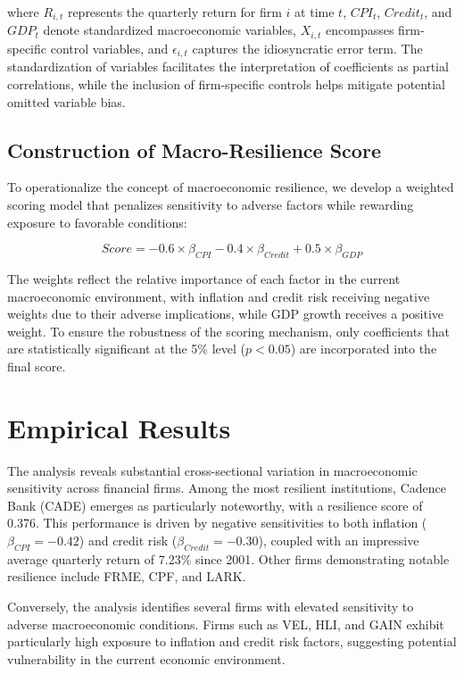 \documentclass[12pt]{article}
\begin{document}
where $R_{i,t}$ represents the quarterly return for firm $i$ at time $t$, $CPI_t$, $Credit_t$, and $GDP_t$ denote standardized macroeconomic variables, $X_{i,t}$ encompasses firm-specific control variables, and $\epsilon_{i,t}$ captures the idiosyncratic error term. The standardization of variables facilitates the interpretation of coefficients as partial correlations, while the inclusion of firm-specific controls helps mitigate potential omitted variable bias.

\subsection{Construction of Macro-Resilience Score}

To operationalize the concept of macroeconomic resilience, we develop a weighted scoring model that penalizes sensitivity to adverse factors while rewarding exposure to favorable conditions:

\begin{equation}
    Score = -0.6 \times \beta_{CPI} - 0.4 \times \beta_{Credit} + 0.5 \times \beta_{GDP}
\end{equation}

The weights reflect the relative importance of each factor in the current macroeconomic environment, with inflation and credit risk receiving negative weights due to their adverse implications, while GDP growth receives a positive weight. To ensure the robustness of the scoring mechanism, only coefficients that are statistically significant at the 5\% level ($p < 0.05$) are incorporated into the final score.

\section{Empirical Results}

The analysis reveals substantial cross-sectional variation in macroeconomic sensitivity across financial firms. Among the most resilient institutions, Cadence Bank (CADE) emerges as particularly noteworthy, with a resilience score of 0.376. This performance is driven by negative sensitivities to both inflation ($\beta_{CPI} = -0.42$) and credit risk ($\beta_{Credit} = -0.30$), coupled with an impressive average quarterly return of 7.23\% since 2001. Other firms demonstrating notable resilience include FRME, CPF, and LARK.

Conversely, the analysis identifies several firms with elevated sensitivity to adverse macroeconomic conditions. Firms such as VEL, HLI, and GAIN exhibit particularly high exposure to inflation and credit risk factors, suggesting potential vulnerability in the current economic environment.
\end{document}
